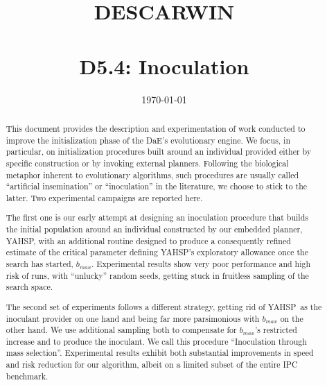 \documentclass[english]{DESCARWINreport}
\title{DESCARWIN\\\bigskip {\em \LARGE The Marriage of Descartes and Darwin}\\\vspace{8cm} {\LARGE D5.4: Inoculation}}
\date{\today}
\newcommand{\DAE}{{\sc DaE}}
\newcommand{\YAHSP}{{\sc YAHSP}}
\begin{document}
\maketitle


\begin{revisions}
\begin{revtable}
\end{revtable}
\begin{revisionlabels}
\revlabel{}
\end{revisionlabels}
\end{revisions}

\begin{abstract}
This document provides the description and experimentation of work conducted to improve the initialization phase of the \DAE's evolutionary engine. We focus, in particular, on initialization procedures built around an individual provided either by specific construction or by invoking external planners. Following the biological metaphor inherent to evolutionary algorithms, such procedures are usually called ``artificial insemination'' or ``inoculation'' in the literature, we choose to stick to the latter. Two experimental campaigns are reported here. 

The first one is our early attempt at designing an inoculation procedure that builds the initial population around an individual constructed by our embedded planner, \YAHSP, with an additional routine designed to produce a consequently refined estimate of the critical parameter defining \YAHSP's exploratory allowance once the search has started, {$b_{max}$}. Experimental results show very poor performance and high risk of runs, with ``unlucky'' random seeds, getting stuck in fruitless sampling of the search space. 

The second set of experiments follows a different strategy, getting rid of \YAHSP\ as the inoculant provider on one hand and being far more parsimonious with {$b_{max}$} on the other hand. We use additional sampling both to compensate for {$b_{max}$}'s restricted increase and to produce the inoculant. We call this procedure ``Inoculation through mass selection''. Experimental results exhibit both substantial improvements in speed and risk reduction for our algorithm, albeit on a limited subset of the entire IPC benchmark. 

\end{abstract}
\end{document}
